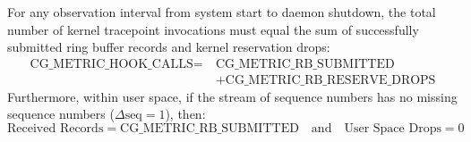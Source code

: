 \documentclass[11pt,a4paper]{article}
\begin{document}
\begin{auditbox}
For any observation interval from system start to daemon shutdown, the total number of kernel tracepoint invocations must equal the sum of successfully submitted ring buffer records and kernel reservation drops:
\[
\begin{aligned}
\text{CG\_METRIC\_HOOK\_CALLS} = \ &\text{CG\_METRIC\_RB\_SUBMITTED} \\
&+ \text{CG\_METRIC\_RB\_RESERVE\_DROPS}
\end{aligned}
\]
Furthermore, within user space, if the stream of sequence numbers has no missing sequence numbers ($\Delta \text{seq} = 1$), then:
\[
\text{Received Records} = \text{CG\_METRIC\_RB\_SUBMITTED} \quad \text{and} \quad \text{User Space Drops} = 0
\]
\end{auditbox}
\end{document}
